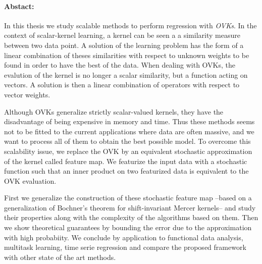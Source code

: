 
\pagestyle{empty}


\begin{center}
\textbf{\spacedlowsmallcaps{\mySubtitle}}
\end{center}

\footnotesize
\paragraph{Abstact:} In this thesis we study scalable methods to perform regression with \emph{\acl{OVK}s}. In the context of scalar-kernel learning, a kernel can be seen a a similarity measure between two data point. A solution of the learning problem has the form of a linear combination of theses similarities with respect to unknown weights to be found in order to have the best  of the data. When dealing with \acl{OVK}s, the evalution of the kernel is no longer a scalar similarity, but a function acting on vectors. A solution is then a linear combination of operators with respect to vector weights.

Although \acl{OVK}s generalize strictly scalar-valued kernels, they have the disadvantage of being expensive in memory and time. Thus these methods seems not to be fitted to the current applications where data are often massive, and we want to process all of them to obtain the best possible model. To overcome this scalability issue, we replace the \acl{OVK} by an equivalent stochastic approximation of the kernel called feature map. We featurize the input data with a stochastic function such that an inner product on two featurized data is equivalent to the \acl{OVK} evaluation.

First we generalize the construction of these stochastic feature map --based on a generalization of Bochner's theorem for shift-invariant Mercer kernels-- and study their properties along with the complexity of the algorithms based on them. Then we show theoretical guarantees by bounding the error due to the approximation with high probabiity. We conclude by application to functional data analysis, multitask learning, time serie regression and compare the proposed framework with other state of the art methods.

